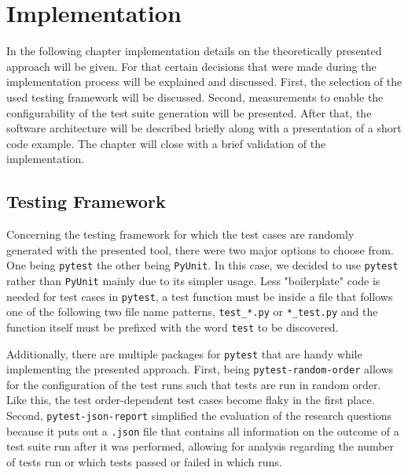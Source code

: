 \documentclass[
fancyheadings, %
%
%
]{stsreprt}
\begin{document}
\chapter{Implementation}\label{ch:imple}
In the following chapter implementation details on the theoretically presented approach will be given.
For that certain decisions that were made during the implementation process will be explained and discussed. 
First, the selection of the used testing framework will be discussed. 
Second, measurements to enable the configurability of the test suite generation will be presented.
After that, the software architecture will be described briefly along with a presentation of a short code example. 
The chapter will close with a brief validation of the implementation.



\section{Testing Framework}
Concerning the testing framework for which the test cases are randomly generated with the presented tool, there were two major options to choose from. 
One being \texttt{pytest} the other being \texttt{PyUnit}. In this case, we decided to use \texttt{pytest} rather than \texttt{PyUnit} mainly due to its simpler usage.
Less "boilerplate" code is needed for test cases in \texttt{pytest}, a test function must be inside a file that follows one of the following two file name patterns, \lstinline{test_*.py} or \lstinline{*_test.py} and the function itself must be prefixed with the word \lstinline{test} to be discovered. \par
Additionally, there are multiple packages for \texttt{pytest} that are handy while implementing the presented approach.
First, being \texttt{pytest-random-order} allows for the configuration of the test runs such that tests are run in random order. 
Like this, the test order-dependent test cases become flaky in the first place.
Second, \texttt{pytest-json-report} simplified the evaluation of the research questions because it puts out a \lstinline{.json} file that contains all information on the outcome of a test suite run after it was performed, allowing for analysis regarding the number of tests run or which tests passed or failed in which runs.
\end{document}
